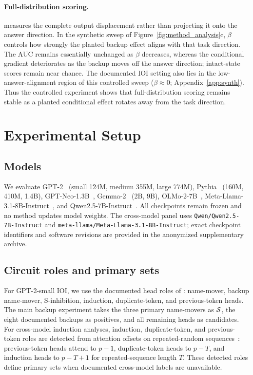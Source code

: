 \paragraph{Full-distribution scoring.}
\coax measures the complete output displacement rather than projecting it
onto the answer direction.
In the synthetic sweep of Figure~\ref{fig:method_analysis}c, $\beta$ controls
how strongly the planted backup effect aligns with that task direction.
The \coax AUC remains essentially unchanged as $\beta$ decreases, whereas the
conditional gradient deteriorates as the backup moves off the answer
direction; intact-state scores remain near chance.
The documented IOI setting also lies in the low-answer-alignment region of this controlled sweep ($\beta\approx0$; Appendix~\ref{app:synth}).
Thus the controlled experiment shows that full-distribution scoring remains stable as a planted conditional effect rotates away from the task direction.


\clearpage
\section{Experimental Setup}
\label{app:setup}

\subsection{Models}
\label{app:models}

We evaluate GPT-2~\citep{radford2019gpt2} (small 124M, medium 355M, large 774M), Pythia~\citep{biderman2023pythia} (160M, 410M, 1.4B), GPT-Neo-1.3B~\citep{black2021gptneo}, Gemma-2~\citep{gemma2024} (2B, 9B), OLMo-2-7B~\citep{olmo2024}, Meta-Llama-3.1-8B-Instruct~\citep{llama3}, and Qwen2.5-7B-Instruct~\citep{qwen2025}.
All checkpoints remain frozen and no method updates model weights.
The cross-model panel uses \texttt{Qwen/Qwen2.5-7B-Instruct} and \texttt{meta-llama/Meta-Llama-3.1-8B-Instruct}; exact checkpoint identifiers and software revisions are provided in the anonymized supplementary archive.

\subsection{Circuit roles and primary sets}
\label{app:circuitroles}

For GPT-2-small IOI, we use the documented head roles of \citet{wang2022ioi}: name-mover, backup name-mover, S-inhibition, induction, duplicate-token, and previous-token heads.
The main backup experiment takes the three primary name-movers as $\mathcal{S}$, the eight documented backups as positives, and all remaining heads as candidates.
For cross-model induction analyses, induction, duplicate-token, and previous-token roles are detected from attention offsets on repeated-random sequences~\citep{olsson2022induction}: previous-token heads attend to $p{-}1$, duplicate-token heads to $p{-}T$, and induction heads to $p{-}T{+}1$ for repeated-sequence length $T$.
These detected roles define primary sets when documented cross-model labels are unavailable.

